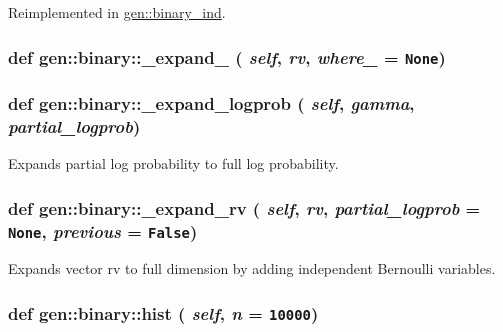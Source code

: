 Reimplemented in \hyperlink{classgen_1_1binary__ind_d0e8fc3004c8d408ee9fa3b6839aa42e}{gen::binary\_\-ind}.\hypertarget{classgen_1_1binary_621bfe54add415f43a7b206b4eef4913}{
\subsubsection[{\_\-expand\_\-01}]{\setlength{\rightskip}{0pt plus 5cm}def gen::binary::\_\-expand\_ ( {\em self}, \/   {\em rv}, \/   {\em where\_} = {\tt None})}}
\label{classgen_1_1binary_621bfe54add415f43a7b206b4eef4913}


\hypertarget{classgen_1_1binary_6c3df954e07beb8cac3fca8b0e29865c}{
\subsubsection[{\_\-expand\_\-logprob}]{\setlength{\rightskip}{0pt plus 5cm}def gen::binary::\_\-expand\_\-logprob ( {\em self}, \/   {\em gamma}, \/   {\em partial\_\-logprob})}}
\label{classgen_1_1binary_6c3df954e07beb8cac3fca8b0e29865c}


Expands partial log probability to full log probability. 

\hypertarget{classgen_1_1binary_4d26e77dfacc2f6cfc603d7995e25752}{
\subsubsection[{\_\-expand\_\-rv}]{\setlength{\rightskip}{0pt plus 5cm}def gen::binary::\_\-expand\_\-rv ( {\em self}, \/   {\em rv}, \/   {\em partial\_\-logprob} = {\tt None}, \/   {\em previous} = {\tt False})}}
\label{classgen_1_1binary_4d26e77dfacc2f6cfc603d7995e25752}


Expands vector rv to full dimension by adding independent Bernoulli variables. 

\hypertarget{classgen_1_1binary_9cf0ff8452df83ccbae5ba1e56136645}{
\subsubsection[{hist}]{\setlength{\rightskip}{0pt plus 5cm}def gen::binary::hist ( {\em self}, \/   {\em n} = {\tt 10000})}}
\label{classgen_1_1binary_9cf0ff8452df83ccbae5ba1e56136645}



